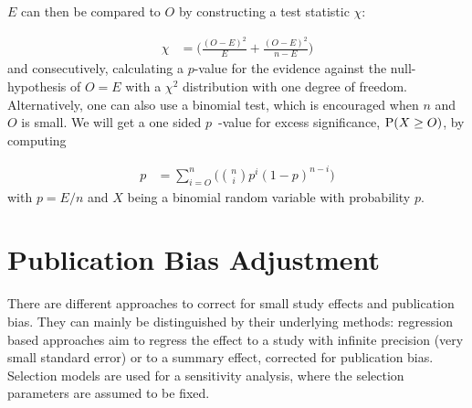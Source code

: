 \documentclass[11pt,a4paper,twoside]{book}\usepackage[]{graphicx}\usepackage[]{color}
\begin{document}
$E$ can then be compared to $O$ by constructing a test statistic $\chi$:

\begin{align}
\chi  &= \bigg( \frac{(O - E)^2}{E} + \frac{(O - E)^2}{n - E}\bigg) \nonumber
\end{align}
and consecutively, calculating a $p$\hspace{0.4mm}-value for the evidence against the null-hypothesis of $O = E$ with a $\chi^2$ distribution with one degree of freedom. Alternatively, one can also use a binomial test, which is encouraged when $n$ and $O$ is small. We will get a one sided $p$\hspace{0.4mm}~-value for excess significance, $\P(X \geq O)$, by computing

\begin{align}
p &= \sum_{i = O}^n\Big({n \choose i} p^i (1-p)^{n - i}\Big) \nonumber
\end{align}
with $p = E/n$ and $X$ being a binomial random variable with probability $p$. 











\section{Publication Bias Adjustment}
There are different approaches to correct for small study effects and publication bias. They can mainly be distinguished by their underlying methods: regression based approaches aim to regress the effect to a study with infinite precision (\ie very small standard error) or to a summary effect, corrected for publication bias. Selection models are used for a sensitivity analysis, where the selection parameters are assumed to be fixed. 
\end{document}
